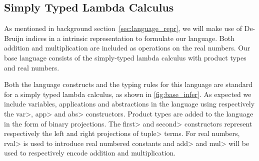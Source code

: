 \subsection{Simply Typed Lambda Calculus}\label{sec:formal_stlc}
  As mentioned in background section~\ref{sec:language_repr}, we will make use of De-Bruijn indices in a intrinsic representation to formulate our language.
  Both addition and multiplication are included as operations on the real numbers.
  Our base language consists of the simply-typed lambda calculus with product types and real numbers.

  Both the language constructs and the typing rules for this language are standard for a simply typed lambda calculus, as shown in \ref{fig:base_infer}.
  As expected we include variables, applications and abstractions in the language using respectively the \<var>, \<app> and \<abs> constructors.
  Product types are added to the language in the form of binary projections.
  The \<first> and \<second> constructors represent respectively the left and right projections of \<tuple> terms.
  For real numbers, \<rval> is used to introduce real numbered constants and \<add> and \<mul> will be used to respectively encode addition and multiplication.

